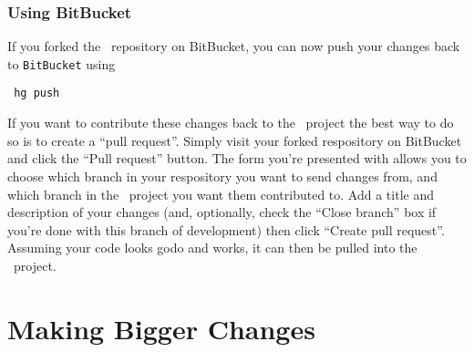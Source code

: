 \subsubsection{Using {\sc BitBucket}}

If you forked the \glc\ repository on {\sc BitBucket}, you can now push your changes back to {\tt BitBucket} using
\begin{verbatim}
 hg push
\end{verbatim}
If you want to contribute these changes back to the \glc\ project the best way to do so is to create a ``pull request''. Simply visit your forked respository on {\sc BitBucket} and click the ``Pull request'' button. The form you're presented with allows you to choose which branch in your respository you want to send changes from, and which branch in the \glc\ project you want them contributed to. Add a title and description of your changes (and, optionally, check the ``Close branch'' box if you're done with this branch of development) then click ``Create pull request''. Assuming your code looks godo and works, it can then be pulled into the \glc\ project.

\section{Making Bigger Changes}

